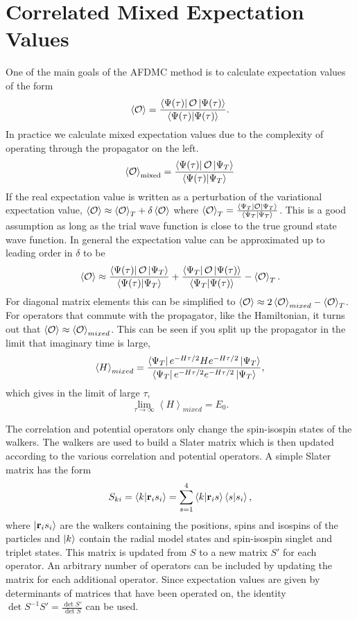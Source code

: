 \section{Correlated Mixed Expectation Values}
One of the main goals of the AFDMC method is to calculate expectation values of the form
\begin{equation}
   \left<\mathcal{O}\right> = \frac{\left< \Psi(\tau) \right|\mathcal{O}\left| \Psi(\tau) \right>}{\left< \Psi(\tau) | \Psi(\tau) \right>}.
\end{equation}
In practice we calculate mixed expectation values due to the complexity of operating through the propagator on the left.
\begin{equation}
   \left<\mathcal{O}\right>_{\mathrm{mixed}} = \frac{\left< \Psi(\tau) \right|\mathcal{O}\left| \Psi_T \right>}{\left< \Psi(\tau) | \Psi_T \right>}
\end{equation}
If the real expectation value is written as a perturbation of the variational expectation value, $\left<\mathcal{O}\right> \approx \left<\mathcal{O}\right>_T+\delta\left<\mathcal{O}\right>$ where $\left<\mathcal{O}\right>_T = \frac{\left< \Psi_T \right|\mathcal{O}\left| \Psi_T \right>}{\left< \Psi_T | \Psi_T \right>}$. This is a good assumption as long as the trial wave function is close to the true ground state wave function. In general the expectation value can be approximated up to leading order in $\delta$ to be
\begin{equation}
   \left<\mathcal{O}\right> \approx \frac{\left< \Psi(\tau) \right|\mathcal{O}\left| \Psi_T \right>}{\left< \Psi(\tau) | \Psi_T \right>}+\frac{\left< \Psi_T \right|\mathcal{O}\left| \Psi(\tau) \right>}{\left< \Psi_T | \Psi(\tau) \right>}-\left<\mathcal{O}\right>_T.
\end{equation}
For diagonal matrix elements this can be simplified to $\left<\mathcal{O}\right> \approx 2\left<\mathcal{O}\right>_{mixed}-\left<\mathcal{O}\right>_T$. For operators that commute with the propagator, like the Hamiltonian, it turns out that $\left<\mathcal{O}\right> \approx \left<\mathcal{O}\right>_{mixed}$. This can be seen if you split up the propagator in the limit that imaginary time is large,
\begin{equation}
   \left<H\right>_{mixed} = \frac{\left< \Psi_T \right|e^{-H\tau/2}He^{-H\tau/2}\left| \Psi_T \right>}{\left< \Psi_T \right|e^{-H\tau/2}e^{-H\tau/2}\left| \Psi_T \right>},
\end{equation}
which gives in the limit of large $\tau$,
\begin{equation}
   \lim\limits_{\tau\rightarrow\infty}\left<H\right>_{mixed} = E_0.
\end{equation}

The correlation and potential operators only change the spin-isospin states of the walkers. The walkers are used to build a Slater matrix which is then updated according to the various correlation and potential operators. A simple Slater matrix has the form
\begin{equation}
   S_{ki} = \left< k | \mathbf{r}_i s_i \right> = \sum\limits_{s=1}^4\left< k | \mathbf{r}_i s \right>\left< s | s_i \right>,
\end{equation}
where $\left| \mathbf{r}_i s_i \right>$ are the walkers containing the positions, spins and isospins of the particles and $\left| k \right>$ contain the radial model states and spin-isospin singlet and triplet states. This matrix is updated from $S$ to a new matrix $S'$ for each operator. An arbitrary number of operators can be included by updating the matrix for each additional operator. Since expectation values are given by determinants of matrices that have been operated on, the identity $\det S^{-1}S'=\frac{\det S'}{\det S}$ can be used.

